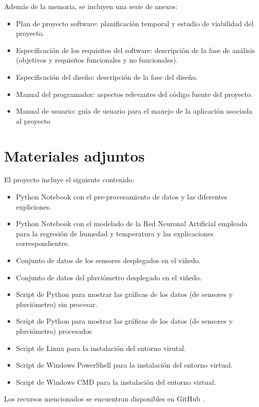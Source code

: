 Además de la memoria, se incluyen una serie de anexos:
\begin{itemize}
    \item Plan de proyecto software: planificación temporal y estudio de viabilidad del proyecto.
    \item Especificación de los requisitos del software: descripción de la fase de análisis (objetivos y requisitos funcionales y no funcionales).
    \item Especificación del diseño: descripción de la fase del diseño.
    \item Manual del programador: aspectos relevantes del código fuente del proyecto.
    \item Manual de usuario: guía de usuario para el manejo de la aplicación asociada al proyecto
\end{itemize}

\section{Materiales adjuntos}
El proyecto incluye el siguiente contenido:
\begin{itemize}
    \item Python Notebook con el pre-procesamiento de datos y las diferentes expliciones.
    \item Python Notebook con el modelado de la Red Neuronal Artificial empleada para la regresión
        de humedad y temperatura y las explicaciones correspondientes.
    \item Conjunto de datos de los sensores desplegados en el viñedo.
    \item Conjunto de datos del pluviómetro desplegado en el viñedo.
    \item Script de Python para mostrar las gráficas de los datos (de sensores y pluviómetro) sin procesar.
    \item Script de Python para mostrar las gráficas de los datos (de sensores y pluviómetro) procesados
    \item Script de Linux para la instalación del entorno virutal.
    \item Script de Windows PowerShell para la instalación del entorno virtual.
    \item Script de Windows CMD para la instalación del entorno virtual.
\end{itemize}
Los recursos mencionados se encuentran disponibles en GitHub \cite{gabriel:2023}.
